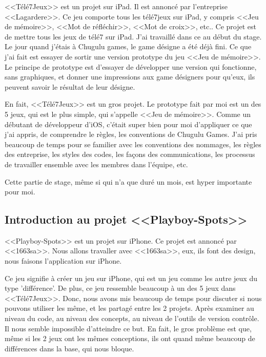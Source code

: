 <<Télé7Jeux>> est un projet sur iPad. Il est annoncé par l'entreprise <<Lagardere>>. Ce jeu comporte tous les télé7jeux sur iPad, y compris <<Jeu de mémoire>>, <<Mot de réfléchir>>, <<Mot de croix>>, etc.. Ce projet est de mettre tous les jeux de télé7 sur iPad.
J'ai travaillé dans ce au début du stage. Le jour quand j'étais à Chugulu games, le game désigne a été déjà fini. Ce que j'ai fait est essayer de sortir une version prototype du jeu <<Jeu de mémoire>>. Le principe de prototype est d'essayer de développer une version qui fonctionne, sans graphiques, et donner une impressions aux game désigners pour qu'eux, ils peuvent savoir le résultat de leur désigne. 

En fait, <<Télé7Jeux>> est un gros projet. Le prototype fait par moi est un des 5 jeux, qui est le plus simple, qui s'appelle <<Jeu de mémoire>>. Comme un débutant de développeur d'iOS, c'était super bien pour moi d'appliquer ce que j'ai appris, de comprendre le règles, les conventions de Chugulu Games. J'ai pris beaucoup de temps pour se familier avec les conventions des nommages, les règles des entreprise, les styles des codes, les façons des communications, les processus de travailler ensemble avec les membres dans l'équipe, etc. 

Cette partie de stage, même si qui n'a que duré un mois, est hyper importante pour moi.


\subsection{Introduction au projet <<Playboy-Spots>>} %
\label{ssub:introduction_au_projet_playboy_s}

<<Playboy-Spots>> est un projet sur iPhone. Ce projet est annoncé par <<1663sa>>. Nous allons travaller avec <<1663sa>>, eux, ils font des design, nous faisons l'application sur iPhone. 

Ce jeu signifie à créer un jeu sur iPhone, qui est un jeu comme les autre jeux du type 'différence'. De plus, ce jeu ressemble beaucoup à un des 5 jeux dans <<Télé7Jeux>>. Donc, nous avons mis beaucoup de temps pour discuter si nous pouvons utiliser les même, et les partagé entre les 2 projets. Après examiner au niveau du code, au niveau des concepts, au niveau de l'outils de version contrôle. Il nous semble impossible d'atteindre ce but. En fait, le gros problème est que, même si les 2 jeux ont les mêmes conceptions, ils ont quand même beaucoup de différences dans la base, qui nous bloque.

